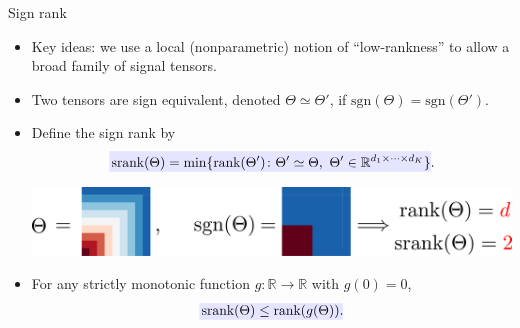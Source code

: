 \documentclass[10pt, mathserif]{beamer} %
\theoremstyle{definition}
\theoremstyle{plain}
\begin{document}
\begin{frame}{Sign rank}
\begin{itemize}
    \item Key ideas: we use {\color{red}a local (nonparametric) notion of ``low-rankness''} to allow a broad family of signal tensors. 
        
    \item  Two tensors are sign equivalent, denoted $\Theta \simeq \Theta'$, if $\text{sgn}(\Theta) = \text{sgn}(\Theta')$.

    \item Define the {\color{red}sign rank} by
  \begin{align}
    \rlap{\textcolor{blue!10}{\rule[-\dp\strutbox]{235pt}{\baselineskip}}}\,\text{srank}(\Theta) = \min\{\text{rank}(\Theta')\colon \Theta'\simeq \Theta, \ \Theta'\in\mathbb{R}^{d_1\times\cdots\times d_K}\}.
\end{align}
    
 \begin{center}
    \includegraphics[width =.9\textwidth]{Figures/signrank_new.pdf}
    \end{center}
\item For any strictly monotonic function $g\colon\mathbb{R}\rightarrow \mathbb{R}$ with $g(0) = 0$,
\[\rlap{\textcolor{blue!10}{\rule[-\dp\strutbox]{105pt}{\baselineskip}}}\,\text{srank}(\Theta)\leq \text{rank}(g(\Theta)).\]
\end{itemize}
\end{frame}
\end{document}
